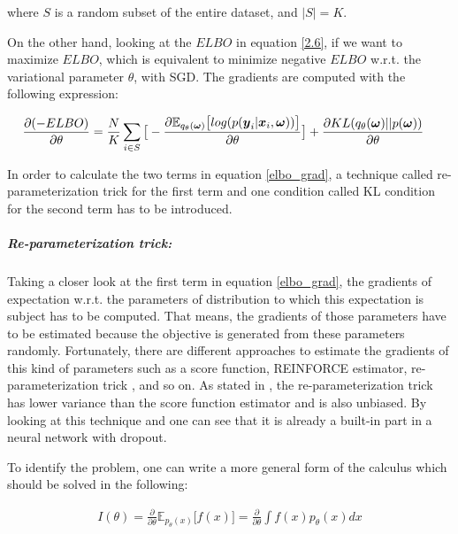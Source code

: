 where $S$ is a random subset of the entire dataset, and $|S| = K$.

On the other hand, looking at the $ELBO$ in equation \ref{2.6}, if we want to maximize $ELBO$, which is equivalent to minimize negative $ELBO$ w.r.t. the variational parameter $\theta$, with SGD. 
The gradients are computed with the following expression:

\begin{equation}
\begin{aligned} \label{elbo_grad}
\frac{\partial (-ELBO)}{\partial \theta} &=\frac{N}{K}\sum_{i \in S}\big[-\frac{\partial \mathbb E_{q_{\theta}(\boldsymbol \omega)} \big[log(p(\boldsymbol y_{i}| \boldsymbol x_{i}, \boldsymbol \omega))\big]}{\partial \theta}\big] + \frac{\partial KL(q_{\theta}(\boldsymbol \omega)||p(\boldsymbol \omega))}{\partial \theta}
\end{aligned}
\end{equation}

In order to calculate the two terms in equation \ref{elbo_grad}, a technique called re-parameterization trick\cite{kingma2013auto} for the first term and one condition called KL condition\cite{gal2016uncertainty} for the second term has to be introduced.

\subparagraph{Re-parameterization trick:} Taking a closer look at the first term in equation \ref{elbo_grad}, the gradients of expectation w.r.t. the parameters of distribution to which this expectation is subject has to be computed. That means, the gradients of those parameters have to be estimated because the objective is generated from these parameters randomly. Fortunately, there are different approaches to estimate the gradients of this kind of parameters such as a score function, REINFORCE  estimator\cite{williams1992simple}, re-parameterization trick \cite{kingma2013auto}, and so on. As stated in \cite{kingma2013auto}, the re-parameterization trick has lower variance than the score function estimator and is also unbiased. 
By looking at this technique and one can see that it is already a built-in part in a neural network with dropout.

To identify the problem, one can write a more general form of the calculus which should be solved in the following:

\begin{equation}
\begin{aligned} \label{repa}
I(\theta) = \frac{\partial}{\partial \theta} \mathbb E_{p_{\theta}(x)} \big[ f(x)\big]= \frac{\partial}{\partial \theta} \int f(x) p_{\theta}(x) dx
\end{aligned}
\end{equation} 


